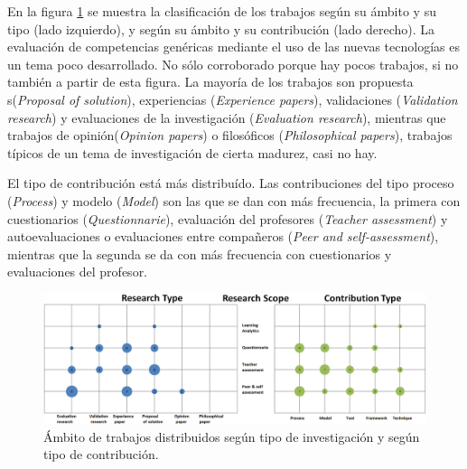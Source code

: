 
En la figura \ref{fig:Burble} se muestra la clasificación de los trabajos según su ámbito y su tipo (lado izquierdo), y según su ámbito y su contribución (lado derecho). La evaluación de competencias genéricas mediante el uso de las nuevas tecnologías es un tema poco desarrollado. No sólo corroborado porque hay pocos trabajos, si no también a partir de esta figura. La mayoría de los trabajos son propuesta s(\emph{Proposal of solution}), experiencias (\emph{Experience papers}), validaciones (\emph{Validation research}) y evaluaciones de la investigación (\emph{Evaluation research}), mientras que trabajos de opinión(\emph{Opinion papers}) o filosóficos (\emph{Philosophical papers}), trabajos típicos de un tema de investigación de cierta madurez, casi no hay.

El tipo de contribución está más distribuído. Las contribuciones del tipo proceso (\emph{Process}) y modelo (\emph{Model}) son las que se dan con más frecuencia, la primera con cuestionarios (\emph{Questionnarie}), evaluación del profesores (\emph{Teacher assessment}) y autoevaluaciones o evaluaciones entre compañeros (\emph{Peer and self-assessment}), mientras que la segunda se da con más frecuencia con cuestionarios y evaluaciones del profesor. 

\pagestyle{empty}
\begin{landscape}
\begin{figure}[H]
  \begin{center}
    \includegraphics[scale=0.4]{Burbujas.png}
  \end{center}
  \caption{Ámbito de trabajos distribuidos según tipo de investigación y según tipo de contribución.}
  \label{fig:Burble}
\end{figure}
\end{landscape}
\pagestyle{fancy}


